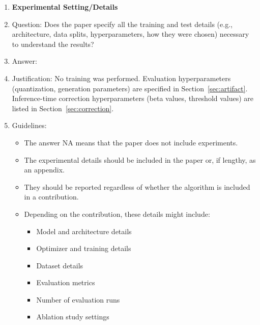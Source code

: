 \begin{enumerate}
\item {\bf Experimental Setting/Details}
\item[] Question: Does the paper specify all the training and test details
(e.g., architecture, data splits, hyperparameters, how they were chosen)
necessary to understand the results?
\item[] Answer: \answerYes{}
\item[] Justification: No training was performed. Evaluation hyperparameters
(quantization, generation parameters) are specified in
Section~\ref{sec:artifact}. Inference-time correction hyperparameters
(beta values, threshold values) are listed in Section~\ref{sec:correction}.
\item[] Guidelines:
\begin{itemize}
    \item The answer NA means that the paper does not include experiments.
    \item The experimental details should be included in the paper or, if
    lengthy, as an appendix.
    \item They should be reported regardless of whether the algorithm is
    included in a contribution.
    \item Depending on the contribution, these details might include:
    \begin{itemize}
        \item Model and architecture details
        \item Optimizer and training details
        \item Dataset details
        \item Evaluation metrics
        \item Number of evaluation runs
        \item Ablation study settings
    \end{itemize}
\end{itemize}


\end{enumerate}
